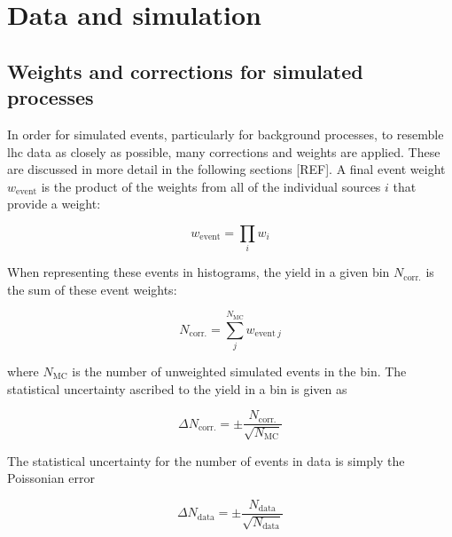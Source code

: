

\section{Data and simulation}
\label{sec:htoinv_data_sim}




\subsection{Weights and corrections for simulated processes}
\label{subsec:htoinv_mc_corrections}

In order for simulated events, particularly for background processes, to resemble \acrshort{lhc} data as closely as possible, many corrections and weights are applied. These are discussed in more detail in the following sections [REF]. A final event weight $w_{\mathrm{event}}$ is the product of the weights from all of the individual sources $i$ that provide a weight:

\begin{equation}
\label{eq:event_weight}
w_{\mathrm{event}} = \prod_i w_i
\end{equation}

When representing these events in histograms, the yield in a given bin $N_{\mathrm{corr.}}$ is the sum of these event weights:

\begin{equation}
\label{eq:bin_weight}
N_{\mathrm{corr.}} = \sum_j^{N_{\mathrm{MC}}} w_{\mathrm{event} \ j}
\end{equation}

where $N_{\mathrm{MC}}$ is the number of unweighted simulated events in the bin. The statistical uncertainty ascribed to the yield in a bin is given as

\begin{equation}
\Delta N_{\mathrm{corr.}} = \pm \frac{ N_{\mathrm{corr.}} }{ \sqrt{N_{\mathrm{MC}}} }
\label{eq:uncertainty_mc_ours}
\end{equation}

The statistical uncertainty for the number of events in data is simply the Poissonian error

\begin{equation}
\Delta N_{\mathrm{data}} = \pm \frac{ N_{\mathrm{data}} }{ \sqrt{N_{\mathrm{data}}} }
\label{eq:uncertainty_data}
\end{equation}

